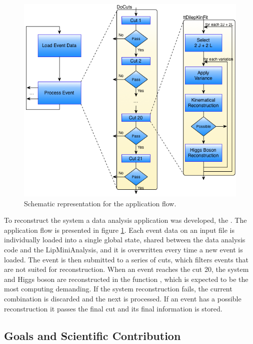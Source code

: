 \begin{figure}[!htp]
	\begin{center}
		\includegraphics[scale=0.5]{imgs/graf_abstract_flow_with_kinfit.png}
		\caption{Schematic representation for the \tth application flow.}
		\label{fig:flow}
	\end{center}
\end{figure}

To reconstruct the \ttH system a data analysis application was developed, the \tth. The application flow is presented in figure \ref{fig:flow}. Each event data on an input file is individually loaded into a single global state, shared between the data analysis code and the LipMiniAnalysis, and it is overwritten every time a new event is loaded. The event is then submitted to a series of cuts, which filters events that are not suited for reconstruction. When an event reaches the cut 20, the \ttbar system and Higgs boson are reconstructed in the function \ttDilepKinFit, which is expected to be the most computing demanding. If the \ttbar system reconstruction fails, the current combination is discarded and the next is processed. If an event has a possible reconstruction it passes the final cut and its final information is stored.

\subsection{Goals and Scientific Contribution}
\label{goals}

